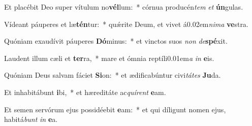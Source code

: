 \item Et placébit Deo super vítulum no\textbf{vél}lum:~* córnua producén\textit{tem} \textit{et} \textbf{ún}gulas.
\item Vídeant páuperes et læ\textbf{tén}tur:~* quǽrite Deum, et vivet á\kern 0.02em\textit{nima} \textbf{ve}stra.
\item Quóniam exaudívit páuperes \textbf{Dó}minus:~* et vinctos suos \textit{non} \textit{de}\textbf{spé}xit.
\item Laudent illum cæli et \textbf{ter}ra,~* mare et ómnia reptíli\kern 0.01em\textit{a} \textit{in} \textbf{e}is.
\item Quóniam Deus salvam fáciet \textbf{Si}on:~* et ædificabúntur civi\textit{tátes} \textbf{Ju}da.
\item Et inhabitábunt \textbf{i}bi,~* et hæreditáte ac\textit{quírent} \textbf{e}am.
\item Et semen servórum ejus possidéebit \textbf{e}am:~* et qui díligunt nomen ejus, habitá\textit{bunt} \textit{in} \textbf{e}a.
